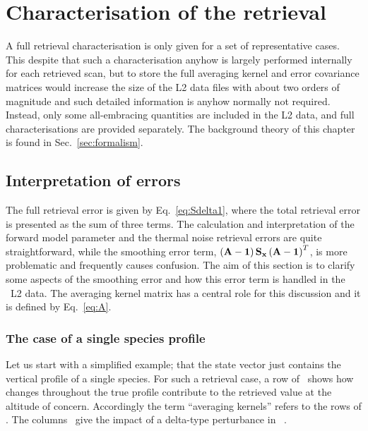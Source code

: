 \chapter{Characterisation of the retrieval}
\label{chapter:characterisation}
%
A full retrieval characterisation is only given for a set of representative
cases. This despite that such a characterisation anyhow is largely performed
internally for each retrieved scan, but to store the full averaging kernel and
error covariance matrices would increase the size of the L2 data files with
about two orders of magnitude and such detailed information is anyhow normally
not required. Instead, only some all-embracing quantities are included in the
L2 data, and full characterisations are provided separately. The background
theory of this chapter is found in Sec.~\ref{sec:formalism}.
 


\section{Interpretation of errors}
\label{sec:char:interpret}
%
The full retrieval error is given by Eq.~\ref{eq:Sdelta1}, where the total
retrieval error is presented as the sum of three terms. The calculation and
interpretation of the forward model parameter and the thermal noise retrieval
errors are quite straightforward, while the smoothing error term,
$\left(\mathbf{A}-\mathbf{1}\right)\mathbf{S}_{\mathbf{x}}\left(\mathbf{A}-\mathbf{1}\right)^T$,
is more problematic and frequently causes confusion. The aim of this section
is to clarify some aspects of the smoothing error and how this error term is
handled in the \smr\ L2 data. The averaging kernel matrix has a central
role for this discussion and it is defined by Eq.~\ref{eq:A}.


\subsection*{The case of a single species profile}
%
Let us start with a simplified example; that the state vector just contains the
vertical profile of a single species. For such a retrieval case, a row of
\AvrKrnMtr\ shows how changes throughout the true profile contribute to the
retrieved value at the altitude of concern. Accordingly the term ``averaging
kernels'' refers to the rows of \AvrKrnMtr. The columns \AvrKrnMtr\ give the
impact of a delta-type perturbance in \SttVct\ \citep{rodgers:00}.

